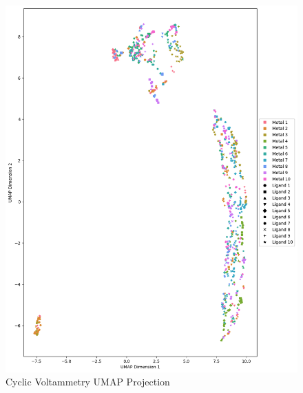 \begin{figure}[H]
  \centering
    \includegraphics[width=1.0\textwidth]{figures/cv_umap.png}
    \caption{Cyclic Voltammetry UMAP Projection}
    \label{cv-umap}
\end{figure}
